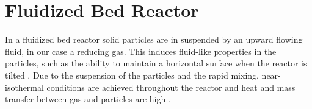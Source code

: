 


\color{black}
\section{Fluidized Bed Reactor}
\label{sec:basicFBR}
In a fluidized bed reactor solid particles are in suspended by an upward flowing fluid, in our case a reducing gas.
This induces fluid-like properties in the particles, such as the ability to maintain a horizontal surface when the reactor is tilted \cite{zustand_eng}.
Due to the suspension of the particles and the rapid mixing, near-isothermal conditions are achieved throughout the reactor and heat and mass transfer between gas and particles are high \cite{advantageFBR}.

